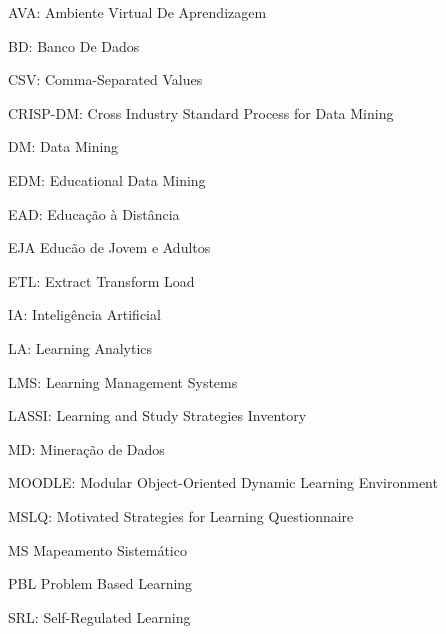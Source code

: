 \documentclass[
	12pt,				%
	openright,			%
	oneside,
	a4paper,			%
	english,			%
	french,				%
	spanish,			%
	brazil,				%
	]{abntex2}
\begin{document}

\frenchspacing 


\imprimircapa

\imprimirfolhaderosto


\listoffigures*
\cleardoublepage

\listoftables*
\cleardoublepage

\begin{siglas}
  \item[AVA:] Ambiente Virtual De Aprendizagem
  \item[BD:] Banco De Dados
  \item[CSV:] Comma-Separated Values
  \item[CRISP-DM:] Cross Industry Standard Process for Data Mining
  \item[DM:] Data Mining
  \item[EDM:] Educational Data Mining
  \item[EAD:] Educação à Distância
  \item[EJA] Educão de Jovem e Adultos
  \item[ETL:] Extract Transform Load
  \item[IA:] Inteligência Artificial
  \item[LA:] Learning Analytics
  \item[LMS:] Learning Management Systems
  \item[LASSI:] Learning and Study Strategies Inventory
  \item[MD:] Mineração de Dados
  \item[MOODLE:] Modular Object-Oriented Dynamic Learning Environment
  \item[MSLQ:] Motivated Strategies for Learning Questionnaire
  \item[MS] Mapeamento Sistemático
  \item[PBL] Problem Based Learning
  \item[SRL:] Self-Regulated Learning
\end{siglas}
\end{document}
